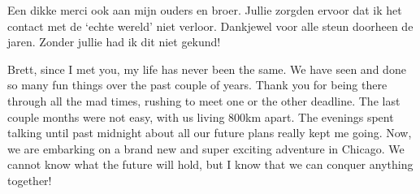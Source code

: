 Een dikke merci ook aan mijn ouders en broer. Jullie zorgden ervoor dat ik het contact met de
`echte wereld' niet verloor. 
Dankjewel voor alle steun doorheen de jaren. Zonder jullie had ik dit niet gekund! 


Brett, since I met you, my life has never been the same. We have seen and done so many fun things
over the past couple of years. 
Thank you for being there through all the mad times, rushing to meet one or the other deadline.
The last couple months were not easy, with us living 800\unit{km} apart. The evenings spent talking
until past midnight about all our future plans really kept me going. 
Now, we are embarking on a brand new and super exciting adventure in Chicago. 
We cannot know what the future will hold, but I know that we can conquer anything together!



